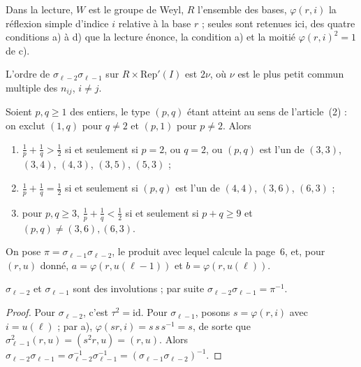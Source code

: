 \noindent Dans la lecture, $W$ est le groupe de Weyl, $R$ l'ensemble des bases, $\varphi(r, i)$ la réflexion simple d'indice $i$ relative à la base $r$ ; seules sont retenues ici, des quatre conditions a) à d) que la lecture énonce, la condition a) et la moitié $\varphi(r,i)^2 = 1$ de c).

\begin{enonce}
L'ordre de $\sigma_{\ell-2}\sigma_{\ell-1}$ sur $R \times \mathrm{Rep}'(I)$ est $2\nu$, où $\nu$ est le plus petit commun multiple des $n_{ij}$, $i \neq j$.
\end{enonce}

\begin{enonce}
Soient $p, q \geq 1$ des entiers, le type $(p, q)$ étant atteint au sens de l'article~(2) : on exclut $(1, q)$ pour $q \neq 2$ et $(p, 1)$ pour $p \neq 2$. Alors
\begin{enumerate}
\item $\frac1p + \frac1q > \frac12$ si et seulement si $p = 2$, ou $q = 2$, ou $(p, q)$ est l'un de $(3,3)$, $(3,4)$, $(4,3)$, $(3,5)$, $(5,3)$ ;
\item $\frac1p + \frac1q = \frac12$ si et seulement si $(p, q)$ est l'un de $(4,4)$, $(3,6)$, $(6,3)$ ;
\item pour $p, q \geq 3$, $\frac1p + \frac1q < \frac12$ si et seulement si $p + q \geq 9$ et $(p, q) \neq (3,6), (6,3)$.
\end{enumerate}
\end{enonce}

On pose $\pi = \sigma_{\ell-1}\sigma_{\ell-2}$, le produit avec lequel calcule la page~6, et, pour $(r, u)$ donné, $a = \varphi(r, u(\ell-1))$ et $b = \varphi(r, u(\ell))$.

\begin{lemme}\label{lem:88-invol}
$\sigma_{\ell-2}$ et $\sigma_{\ell-1}$ sont des involutions ; par suite $\sigma_{\ell-2}\sigma_{\ell-1} = \pi^{-1}$.
\end{lemme}

\begin{proof}
Pour $\sigma_{\ell-2}$, c'est $\tau^2 = \mathrm{id}$. Pour $\sigma_{\ell-1}$, posons $s = \varphi(r, i)$ avec $i = u(\ell)$ ; par a), $\varphi(sr, i) = s\,s\,s^{-1} = s$, de sorte que $\sigma_{\ell-1}^2(r, u) = (s^2 r, u) = (r, u)$. Alors $\sigma_{\ell-2}\sigma_{\ell-1} = \sigma_{\ell-2}^{-1}\sigma_{\ell-1}^{-1} = (\sigma_{\ell-1}\sigma_{\ell-2})^{-1}$.
\end{proof}

